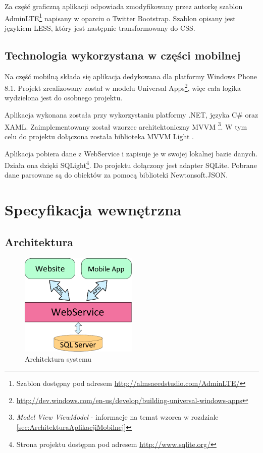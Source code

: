 \documentclass{book}
\begin{document}
		Za część graficzną aplikacji odpowiada zmodyfikowany przez autorkę szablon AdminLTE\footnote{Szablon dostępny pod adresem \url{http://almsaeedstudio.com/AdminLTE/}} napisany w oparciu o Twitter Bootstrap. Szablon opisany jest językiem LESS, który jest następnie transformowany do CSS.
		
		\section{Technologia wykorzystana w części mobilnej}
	
		Na część mobilną składa się aplikacja dedykowana dla platformy Windows Phone 8.1. Projekt zrealizowany został w modelu Universal Apps\footnote{\url{http://dev.windows.com/en-us/develop/building-universal-windows-apps}}, więc cała logika wydzielona jest do osobnego projektu.
		
		Aplikacja wykonana została przy wykorzystaniu platformy .NET, języka C\# oraz XAML. Zaimplementowany został wzorzec architektoniczny MVVM \footnote{\emph{Model View ViewModel} - informacje na temat wzorca w rozdziale \ref{sec:ArchitekturaAplikacjiMobilnej}}. W tym celu do projektu dołączona została biblioteka MVVM Light . %
		
		Aplikacja pobiera dane z WebService i zapisuje je w swojej lokalnej bazie danych. Działa ona dzięki SQLight\footnote{Strona projektu dostępna pod adresem \url{http://www.sqlite.org/}}. Do projektu dołączony jest adapter SQLite. Pobrane dane parsowane są do obiektów za pomocą biblioteki Newtonsoft.JSON.

	\chapter{Specyfikacja wewnętrzna}
		\section{Architektura}
		
		\begin{figure}		
			\centering
			\includegraphics[width=0.5\textwidth]{architektura.pdf}
			\caption{Architektura systemu}
			\label{fig:architektura}
		\end{figure}
		
\end{document}
